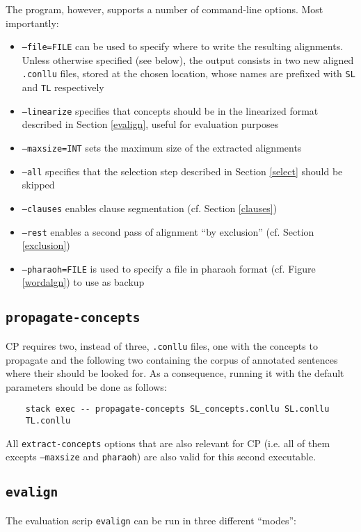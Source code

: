 The program, however, supports a number of command-line options. Most importantly:
\begin{itemize}
    \item \texttt{--file=FILE} can be used to specify where to write the resulting alignments. Unless otherwise specified (see below), the output consists in two new aligned \texttt{.conllu} files, stored at the chosen location, whose names are prefixed with \texttt{SL} and \texttt{TL} respectively
    \item \texttt{--linearize} specifies that concepts should be in the linearized format described in Section \ref{evalign}, useful for evaluation purposes
    \item \texttt{--maxsize=INT} sets the maximum size of the extracted alignments
    \item \texttt{--all} specifies that the selection step described in Section \ref{select} should be skipped
    \item \texttt{--clauses} enables clause segmentation (cf. Section \ref{clauses})
    \item \texttt{--rest} enables a second pass of alignment ``by exclusion'' (cf. Section \ref{exclusion}) 
    \item \texttt{--pharaoh=FILE} is used to specify a file in pharaoh format (cf. Figure \ref{wordalgn}) to use as backup
\end{itemize}

\subsection{\texttt{propagate-concepts}}
CP requires two, instead of three, \texttt{.conllu} files, one with the concepts to propagate and the following two containing the corpus of annotated sentences where their should be looked for. As a consequence, running it with the default parameters should be done as follows: \smallskip

\begin{verbatim}
    stack exec -- propagate-concepts SL_concepts.conllu SL.conllu 
    TL.conllu
\end{verbatim} \smallskip

All \texttt{extract-concepts} options that are also relevant for CP (i.e. all of them excepts \texttt{--maxsize} and \texttt{pharaoh}) are also valid for this second executable.

\subsection{\texttt{evalign}}
The evaluation scrip \texttt{evalign} can be run in three different ``modes'': \smallskip


